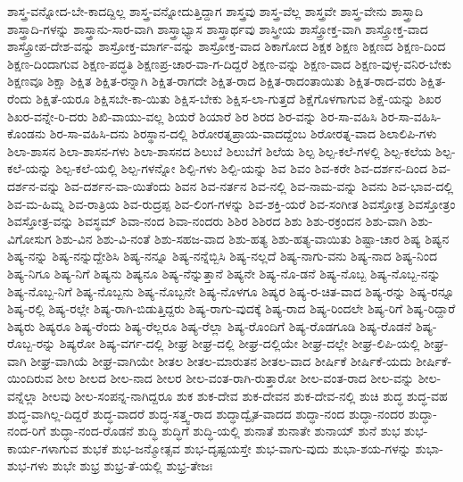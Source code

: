{ಶಾಸ್ತ್ರ-ವನ್ನೋದ-ಬೇ-ಕಾದದ್ದಿಲ್ಲ
ಶಾಸ್ತ್ರ-ವನ್ನೋದುತ್ತಿದ್ದಾಗ
ಶಾಸ್ತ್ರವು
ಶಾಸ್ತ್ರ-ವೆಲ್ಲ
ಶಾಸ್ತ್ರವೇ
ಶಾಸ್ತ್ರ-ವೇನು
ಶಾಸ್ತ್ರಾದಿ
ಶಾಸ್ತ್ರಾದಿ-ಗಳನ್ನು
ಶಾಸ್ತ್ರಾನು-ಸಾರ-ವಾಗಿ
ಶಾಸ್ತ್ರಾಭ್ಯಾಸ
ಶಾಸ್ತ್ರಾರ್ಥವು
ಶಾಸ್ತ್ರೀಯ
ಶಾಸ್ತ್ರೋಕ್ತ-ವಾಗಿ
ಶಾಸ್ತ್ರೋಕ್ತ-ವಾದ
ಶಾಸ್ತ್ರೋಪ-ದೇಶ-ವನ್ನು
ಶಾಸ್ರೋಕ್ತ-ಮಾರ್ಗ-ವನ್ನು
ಶಾಸ್ರೋಕ್ತ-ವಾದ
ಶಿಕಾಗೋದ
ಶಿಕ್ಷಕ
ಶಿಕ್ಷಣ
ಶಿಕ್ಷಣದ
ಶಿಕ್ಷಣ-ದಿಂದ
ಶಿಕ್ಷಣ-ದಿಂದಾಗುವ
ಶಿಕ್ಷಣ-ಪದ್ಧತಿ
ಶಿಕ್ಷಣಪ್ರ-ಚಾರ-ವಾ-ಗ-ದಿದ್ದರೆ
ಶಿಕ್ಷಣ-ವನ್ನು
ಶಿಕ್ಷಣ-ವಾದ
ಶಿಕ್ಷಣ-ವುಳ್ಳ-ವನಿರ-ಬೇಕು
ಶಿಕ್ಷಣವೂ
ಶಿಕ್ಷಾ
ಶಿಕ್ಷಿತ
ಶಿಕ್ಷಿತ-ರನ್ನಾಗಿ
ಶಿಕ್ಷಿತ-ರಾಗದೇ
ಶಿಕ್ಷಿತ-ರಾದ
ಶಿಕ್ಷಿತ-ರಾದಂತಾಯಿತು
ಶಿಕ್ಷಿತ-ರಾದ-ವರು
ಶಿಕ್ಷಿತ-ರೆಂದು
ಶಿಕ್ಷಿತೆ-ಯರೂ
ಶಿಕ್ಷಿಸಬೇ-ಕಾ-ಯಿತು
ಶಿಕ್ಷಿಸ-ಬೇಕು
ಶಿಕ್ಷಿಸ-ಲಾ-ಗುತ್ತದೆ
ಶಿಕ್ಷೆಗೊಳಗಾಗುವ
ಶಿಕ್ಷೆ-ಯನ್ನು
ಶಿಖರ
ಶಿಖರ-ವನ್ನೇ-ರಿ-ದರು
ಶಿಖಿ-ವಾಯು-ವಲ್ಲ
ಶಿಯರೆ
ಶಿಯಾರೆ
ಶಿರ
ಶಿರದ
ಶಿರ-ವನ್ನು
ಶಿರ-ಸಾ-ವಹಿಸಿ
ಶಿರ-ಸಾ-ವಹಿಸಿ-ಕೊಂಡನು
ಶಿರ-ಸಾ-ವಹಿಸಿ-ದನು
ಶಿರಸ್ಥಾನ-ದಲ್ಲಿ
ಶಿರೋರತ್ನಪ್ರಾಯ-ವಾದದ್ದೆಂಬ
ಶಿರೋರತ್ನ-ವಾದ
ಶಿಲಾಲಿಪಿ-ಗಳು
ಶಿಲಾ-ಶಾಸನ
ಶಿಲಾ-ಶಾಸನ-ಗಳು
ಶಿಲಾ-ಶಾಸನದ
ಶಿಲುಬೆ
ಶಿಲುಬೆಗೆ
ಶಿಲೆಯ
ಶಿಲ್ಪ
ಶಿಲ್ಪ-ಕಲೆ-ಗಳಲ್ಲಿ
ಶಿಲ್ಪ-ಕಲೆಯ
ಶಿಲ್ಪ-ಕಲೆ-ಯನ್ನು
ಶಿಲ್ಪ-ಕಲೆ-ಯಲ್ಲಿ
ಶಿಲ್ಪ-ಗಳನ್ನೋ
ಶಿಲ್ಪಿ-ಗಳು
ಶಿಲ್ಪಿ-ಯನ್ನು
ಶಿವ
ಶಿವಂ
ಶಿವ-ಕರೇ
ಶಿವ-ದರ್ಶನ-ದಿಂದ
ಶಿವ-ದರ್ಶನ-ವನ್ನು
ಶಿವ-ದರ್ಶನ-ವಾ-ಯಿತೆಂದು
ಶಿವನ
ಶಿವ-ನರ್ತನ
ಶಿವ-ನಲ್ಲಿ
ಶಿವ-ನಾಮ-ವನ್ನು
ಶಿವನು
ಶಿವ-ಭಾವ-ದಲ್ಲಿ
ಶಿವ-ಮ-ಹಿಮ್ನ
ಶಿವ-ರಾತ್ರಿಯ
ಶಿವ-ರುದ್ರಪ್ಪ
ಶಿವ-ಲಿಂಗ-ಗಳನ್ನು
ಶಿವ-ಶಕ್ತಿ-ಯರೆ
ಶಿವ-ಸಂಗೀತ
ಶಿವಸ್ತೋತ್ರ
ಶಿವಸ್ತೋತ್ರಂ
ಶಿವಸ್ತೋತ್ರ-ವನ್ನು
ಶಿವಸ್ಥಮ್
ಶಿವಾ-ನಂದ
ಶಿವಾ-ನಂದರು
ಶಿಶಿರ
ಶಿಶಿರದ
ಶಿಶು
ಶಿಶು-ರಕ್ರಂದನ
ಶಿಶು-ವಾಗಿ
ಶಿಶು-ವಿಗೋಸುಗ
ಶಿಶು-ವಿನ
ಶಿಶು-ವಿ-ನಂತೆ
ಶಿಶು-ಸಹಜ-ವಾದ
ಶಿಶು-ಹತ್ಯ
ಶಿಶು-ಹತ್ಯ-ವಾಯಿತು
ಶಿಷ್ಟಾ-ಚಾರ
ಶಿಷ್ಯ
ಶಿಷ್ಯನ
ಶಿಷ್ಯ-ನನ್ನು
ಶಿಷ್ಯ-ನನ್ನುದ್ದೇಶಿಸಿ
ಶಿಷ್ಯ-ನನ್ನೂ
ಶಿಷ್ಯ-ನನ್ನೆಬ್ಬಿಸಿ
ಶಿಷ್ಯ-ನಲ್ಲದೆ
ಶಿಷ್ಯ-ನಾಗು-ವನು
ಶಿಷ್ಯ-ನಾದ
ಶಿಷ್ಯ-ನಿಂದ
ಶಿಷ್ಯ-ನಿಗೂ
ಶಿಷ್ಯ-ನಿಗೆ
ಶಿಷ್ಯನು
ಶಿಷ್ಯನೂ
ಶಿಷ್ಯ-ನೆನ್ನುತ್ತಾನೆ
ಶಿಷ್ಯನೇ
ಶಿಷ್ಯ-ನೊ-ಡನೆ
ಶಿಷ್ಯ-ನೊಬ್ಬ
ಶಿಷ್ಯ-ನೊಬ್ಬ-ನನ್ನು
ಶಿಷ್ಯ-ನೊಬ್ಬ-ನಿಗೆ
ಶಿಷ್ಯ-ನೊಬ್ಬನು
ಶಿಷ್ಯ-ನೊಬ್ಬನೇ
ಶಿಷ್ಯ-ನೊಳಗೂ
ಶಿಷ್ಯರ
ಶಿಷ್ಯ-ರ-ಚಿತ-ವಾದ
ಶಿಷ್ಯ-ರನ್ನು
ಶಿಷ್ಯ-ರನ್ನೂ
ಶಿಷ್ಯ-ರಲ್ಲಿ
ಶಿಷ್ಯ-ರಲ್ಲೇ
ಶಿಷ್ಯ-ರಾಗಿ-ಬಿಡುತ್ತಿದ್ದರು
ಶಿಷ್ಯ-ರಾಗು-ವುದಕ್ಕೆ
ಶಿಷ್ಯ-ರಾದ
ಶಿಷ್ಯ-ರಿಂದಲೇ
ಶಿಷ್ಯ-ರಿಗೆ
ಶಿಷ್ಯ-ರಿದ್ದಾರೆ
ಶಿಷ್ಯರು
ಶಿಷ್ಯರೂ
ಶಿಷ್ಯ-ರೆಂದು
ಶಿಷ್ಯ-ರೆಲ್ಲರೂ
ಶಿಷ್ಯ-ರೆಲ್ಲಾ
ಶಿಷ್ಯ-ರೊಂದಿಗೆ
ಶಿಷ್ಯ-ರೊಡಗೂಡಿ
ಶಿಷ್ಯ-ರೊಡನೆ
ಶಿಷ್ಯ-ರೊಬ್ಬ-ರನ್ನು
ಶಿಷ್ಯರೋ
ಶಿಷ್ಯ-ವರ್ಗ-ದಲ್ಲಿ
ಶೀಘ್ರ
ಶೀಘ್ರ-ದಲ್ಲಿ
ಶೀಘ್ರ-ದಲ್ಲಿಯೇ
ಶೀಘ್ರ-ದಲ್ಲೇ
ಶೀಘ್ರ-ಲಿಪಿ-ಯಲ್ಲಿ
ಶೀಘ್ರ-ವಾಗಿ
ಶೀಘ್ರ-ವಾಗಿಯೆ
ಶೀಘ್ರ-ವಾಗಿಯೇ
ಶೀತಲ
ಶೀತಲ-ಮಾರುತನ
ಶೀತಲ-ವಾದ
ಶೀರ್ಷಿಕೆ
ಶೀರ್ಷಿಕೆ-ಯದು
ಶೀರ್ಷಿಕೆ-ಯಿಂದಿರುವ
ಶೀಲ
ಶೀಲದ
ಶೀಲ-ನಾದ
ಶೀಲರ
ಶೀಲ-ವಂತ-ರಾಗಿ-ರುತ್ತಾರೋ
ಶೀಲ-ವಂತ-ರಾದ
ಶೀಲ-ವನ್ನು
ಶೀಲ-ವನ್ನೆಲ್ಲಾ
ಶೀಲವು
ಶೀಲ-ಸಂಪನ್ನ-ನಾಗಿದ್ದರೂ
ಶುಕ
ಶುಕ-ದೇವ
ಶುಕ-ದೇವನ
ಶುಕ-ದೇವ-ನಲ್ಲಿ
ಶುಚಿ
ಶುದ್ಧ
ಶುದ್ಧ-ವಹ
ಶುದ್ಧ-ವಾಗಿಲ್ಲ-ದಿದ್ದರೆ
ಶುದ್ಧ-ವಾದರೆ
ಶುದ್ಧ-ಸತ್ತ್ವ-ರಾದ
ಶುದ್ಧಾದ್ವೈತ-ವಾದದ
ಶುದ್ಧಾ-ನಂದ
ಶುದ್ಧಾ-ನಂದರ
ಶುದ್ಧಾ-ನಂದ-ರಿಗೆ
ಶುದ್ಧಾ-ನಂದ-ರೊಡನೆ
ಶುದ್ಧಿ
ಶುದ್ಧಿಗೆ
ಶುದ್ಧಿ-ಯಲ್ಲಿ
ಶುನಾತೆ
ಶುನಾತೇ
ಶುನಾಯ್
ಶುನೆ
ಶುಭ
ಶುಭ-ಕಾರ್ಯ-ಗಳಾಗುವ
ಶುಭಕೆ
ಶುಭ-ಜನ್ಮೋತ್ಸವ
ಶುಭ-ದೃಷ್ಟಯಸ್ತೇ
ಶುಭ-ವಾಗು-ವುದು
ಶುಭಾ-ಶಯ-ಗಳನ್ನು
ಶುಭಾ-ಶುಭ-ಗಳು
ಶುಭೇ
ಶುಭ್ರ
ಶುಭ್ರ-ತೆ-ಯಲ್ಲಿ
ಶುಭ್ರ-ತೇಜಃ
}
